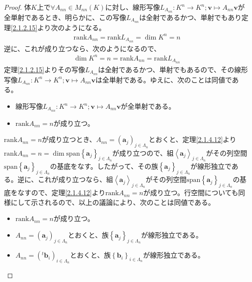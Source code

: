 \documentclass[dvipdfmx]{jsarticle}
\begin{document}
\begin{proof}
体$K$上で$\forall A_{nn} \in M_{nn}(K)$に対し、線形写像$L_{A_{nn}}:K^{n} \rightarrow K^{n};\mathbf{v} \mapsto A_{nn}\mathbf{v}$が全単射であるとき、明らかに、この写像$L_{A_{nn}}$は全射であるかつ、単射でもあり定理\ref{2.1.2.15}より次のようになる。
\begin{align*}
{\mathrm{rank} }A_{nn} = {\mathrm{rank} }L_{A_{nn}} = \dim K^{n} = n
\end{align*}
逆に、これが成り立つなら、次のようになるので、
\begin{align*}
\dim K^{n} = n = {\mathrm{rank} }A_{nn} = {\mathrm{rank} }L_{A_{nn}}
\end{align*}
定理\ref{2.1.2.15}よりその写像$L_{A_{nn}}$は全射であるかつ、単射でもあるので、その線形写像$L_{A_{nn}}:K^{n} \rightarrow K^{n};\mathbf{v} \mapsto A_{nn}\mathbf{v}$は全単射である。ゆえに、次のことは同値である。
\begin{itemize}
\item
  線形写像$L_{A_{nn}}:K^{n} \rightarrow K^{n};\mathbf{v} \mapsto A_{nn}\mathbf{v}$が全単射である。
\item
  ${\mathrm{rank} }A_{nn} = n$が成り立つ。
\end{itemize}\par
${\mathrm{rank} }A_{nn} = n$が成り立つとき、$A_{nn} = \left( \mathbf{a}_{j} \right)_{j \in \varLambda_{n}}$とおくと、定理\ref{2.1.4.12}より${\mathrm{rank} }A_{nn} = n = \dim{{\mathrm{span} }\left\{ \mathbf{a}_{j} \right\}_{j \in \varLambda_{n}}}$が成り立つので、組$\left\langle \mathbf{a}_{j} \right\rangle_{j \in \varLambda_{n}}$がその列空間${\mathrm{span} }\left\{ \mathbf{a}_{j} \right\}_{j \in \varLambda_{n}}$の基底をなす。したがって、その族$\left\{ \mathbf{a}_j \right\}_{j \in \varLambda_{n} } $が線形独立である。逆に、これが成り立つなら、組$\left\langle \mathbf{a}_{j} \right\rangle_{j \in \varLambda_{n}}$がその列空間${\mathrm{span} }\left\{ \mathbf{a}_{j} \right\}_{j \in \varLambda_{n}}$の基底をなすので、定理\ref{2.1.4.12}より${\mathrm{rank} }A_{nn} = n$が成り立つ。行空間についても同様にして示されるので、以上の議論により、次のことは同値である。
\begin{itemize}
\item
  ${\mathrm{rank} }A_{nn} = n$が成り立つ。
\item
  $A_{nn} = \left( \mathbf{a}_{j} \right)_{j \in \varLambda_{n}}$とおくと、族$\left\{ \mathbf{a}_j \right\}_{j \in \varLambda_{n} } $が線形独立である。
\item
  $A_{nn} = \left(^{t}\mathbf{b}_{i} \right)_{i \in \varLambda_{n}}$とおくと、族$\left\{ \mathbf{b}_i \right\}_{i \in \varLambda_{n} } $が線形独立である。

\end{itemize}
\end{proof}
\end{document}
